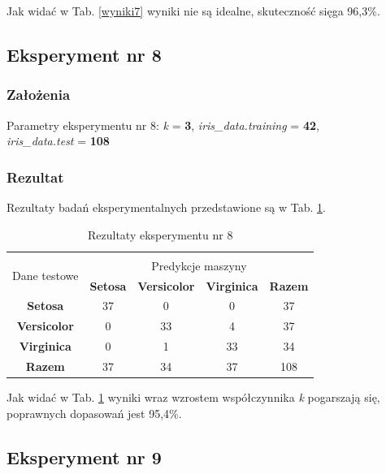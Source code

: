 \documentclass[12pt]{article}
\begin{document}
\noindent Jak widać w Tab. \ref{wyniki7} wyniki nie są idealne, skuteczność sięga 96,3\%. \newline

\subsection{Eksperyment nr 8}
\subsubsection{Założenia}

Parametry eksperymentu nr 8: \textit{k} = \textbf{3}, \textit{iris\_data.training} = \textbf{42}, \\ \textit{iris\_data.test} = \textbf{108}

\subsubsection{Rezultat}

Rezultaty badań eksperymentalnych przedstawione są w Tab. \ref{wyniki8}.
\begin{table}[ht!]
 \centering
 \vspace{0.2cm}
  \begin{tabular}{|*{5}{c|}}
  \hline\\[-0.5cm]
   \multirow{2}{*}{Dane testowe} & \multicolumn{4}{c|}{Predykcje maszyny} \\ \cline{2-5}
   & \textbf{Setosa} & \textbf{Versicolor} & \textbf{Virginica} & \textbf{Razem}\\
  \hline
   \textbf{Setosa} & 37 & 0 & 0 & 37  \\ \hline
   \textbf{Versicolor} & 0 & 33 & 4 & 37  \\ \hline
   \textbf{Virginica} & 0 &  1 & 33 & 34  \\ \hline
   \textbf{Razem} & 37 & 34 & 37 & 108 \\
  \hline
 \end{tabular}
 \caption{Rezultaty eksperymentu nr 8}
 \label{wyniki8}
\end{table}

\noindent Jak widać w Tab. \ref{wyniki8} wyniki wraz wzrostem współczynnika \textit{k} pogarszają się, poprawnych dopasowań jest 95,4\%. \newline

\subsection{Eksperyment nr 9}
\end{document}
